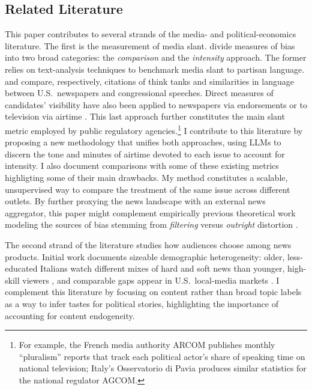 \documentclass[12pt]{article}
\begin{document}
\subsection*{Related Literature}


This paper contributes to several strands of the media- and political-economics literature.
The first is the measurement of media slant. \citet{puglisi_review} divide measures of bias into two broad categories: the \textit{comparison} and the \textit{intensity} approach. The former relies on text-analysis techniques to benchmark media slant to partisan language. \citet{milyo_measure} and \citet{gentzkow2010media}  compare, respectively, citations of think tanks and similarities in language between U.S.\ newspapers and congressional speeches. Direct measures of candidates’ visibility have also been applied to newspapers via endorsements \citep{ChiangKnight2011} or to television via airtime \citep{durante2012partisan,CageHengelHerveUrvoy2022}. This last approach further constitutes the main slant metric employed by public regulatory agencies.\footnote{For example, the French media authority ARCOM publishes monthly “pluralism” reports that track each political actor’s share of speaking time on national television; Italy’s Osservatorio di Pavia produces similar statistics for the national regulator AGCOM.} I contribute to this literature by proposing a new methodology that unifies both approaches, using LLMs to discern the tone and minutes of airtime devoted to each issue to account for intensity. I also document comparisons with some of these existing metrics highligting some of their main drawbacks.   My method constitutes a scalable, unsupervised way to compare the treatment of the same issue across different outlets. By further proxying the news landscape with an external news aggregator, this paper might complement empirically previous  theoretical work modeling the sources of bias stemming from \textit{filtering} versus \textit{outright} distortion \citep{gentzkow2014media}.


The second strand of the literature studies how audiences choose among news products. Initial work documents sizeable demographic heterogeneity: older, less-educated Italians watch different mixes of hard and soft news than younger, high-skill viewers \citep{gambaro2021revealed}, and comparable gaps appear in U.S.\ local-media markets \citep{bang2023,BangSieg2025}. I complement this literature by focusing on content rather than broad topic labels as a way to infer tastes for political stories, highlighting the importance of  accounting for content endogeneity.
\end{document}
